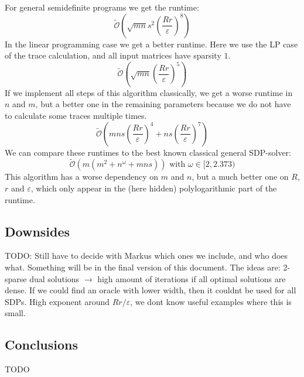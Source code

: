 \documentclass[11pt,a4paper]{scrartcl}
\begin{document}
For general semidefinite programs we get the runtime:
\begin{equation*}
\tilde{\mathcal{O}}\left(\sqrt{mn}s^2\left(\frac{Rr}{\varepsilon}\right)^8\right)
\end{equation*}
In the linear programming case we get a better runtime. Here we use the LP case of the trace calculation, and all input matrices have sparsity $1$.
\begin{equation*}
\tilde{\mathcal{O}}\left(\sqrt{mn}\left(\frac{Rr}{\varepsilon}\right)^5\right)
\end{equation*}
If we implement all steps of this algorithm classically, we get a worse runtime in $n$ and $m$, but a better one in the remaining parameters because we do not have to calculate some traces multiple times.
\begin{equation*}
\tilde{\mathcal{O}}\left(mns\left(\frac{Rr}{\varepsilon}\right)^4+ns\left(\frac{Rr}{\varepsilon}\right)^7\right)
\end{equation*}
We can compare these runtimes to the best known classical general SDP-solver:
\begin{equation*}
\tilde{\mathcal{O}}(m(m^2+n^\omega+mns)) \text{ with } \omega\in[2,2.373)
\end{equation*}
This algorithm has a worse dependency on $m$ and $n$, but a much better one on $R$, $r$ and $\varepsilon$, which only appear in the (here hidden) polylogarithmic part of the runtime.

\subsection{Downsides}
TODO: Still have to decide with Markus which ones we include, and who does what. Something will be in the final version of this document. The ideas are: 2-sparse dual solutions $\rightarrow$ high amount of iterations if all optimal solutions are dense. If we could find an oracle with lower width, then it couldnt be used for all SDPs. High exponent around $Rr/\varepsilon$, we dont know useful examples where this is small.

\subsection{Conclusions}
TODO


\nocite{*}

\printbibliography
\end{document}
